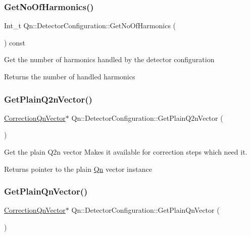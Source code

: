 \subsubsection{\texorpdfstring{Get\+No\+Of\+Harmonics()}{GetNoOfHarmonics()}}
{\footnotesize\ttfamily Int\+\_\+t Qn\+::\+Detector\+Configuration\+::\+Get\+No\+Of\+Harmonics (\begin{DoxyParamCaption}{ }\end{DoxyParamCaption}) const\hspace{0.3cm}{\ttfamily [inline]}}

Get the number of harmonics handled by the detector configuration \begin{DoxyReturn}{Returns}
the number of handled harmonics 
\end{DoxyReturn}
\mbox{\label{classQn_1_1DetectorConfiguration_a25396b7997264f317e5c4ee7d3dcaeac}} 
\subsubsection{\texorpdfstring{Get\+Plain\+Q2n\+Vector()}{GetPlainQ2nVector()}}
{\footnotesize\ttfamily \mbox{\hyperlink{classQn_1_1CorrectionQnVector}{Correction\+Qn\+Vector}}$\ast$ Qn\+::\+Detector\+Configuration\+::\+Get\+Plain\+Q2n\+Vector (\begin{DoxyParamCaption}{ }\end{DoxyParamCaption})\hspace{0.3cm}{\ttfamily [inline]}}

Get the plain Q2n vector Makes it available for correction steps which need it. \begin{DoxyReturn}{Returns}
pointer to the plain \mbox{\hyperlink{namespaceQn}{Qn}} vector instance 
\end{DoxyReturn}
\mbox{\label{classQn_1_1DetectorConfiguration_a3d5ca70800045c579f4bda073a382f68}} 
\subsubsection{\texorpdfstring{Get\+Plain\+Qn\+Vector()}{GetPlainQnVector()}}
{\footnotesize\ttfamily \mbox{\hyperlink{classQn_1_1CorrectionQnVector}{Correction\+Qn\+Vector}}$\ast$ Qn\+::\+Detector\+Configuration\+::\+Get\+Plain\+Qn\+Vector (\begin{DoxyParamCaption}{ }\end{DoxyParamCaption})\hspace{0.3cm}{\ttfamily [inline]}}

